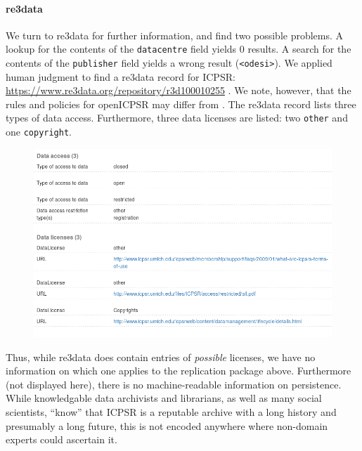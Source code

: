 \paragraph{re3data}
We turn to re3data for further information, and find two possible problems. A lookup for the contents of the \texttt{datacentre} field yields 0 results. A search for the contents of the \texttt{publisher} field yields a wrong result (\lstinline|<odesi>|). We applied human judgment to find a re3data record for ICPSR: \url{https://www.re3data.org/repository/r3d100010255} \parencite{Re3data-icpsr}. We note, however, that the rules and policies for openICPSR may differ from .
The re3data record lists three types of data access. Furthermore, three data licenses are listed: two \texttt{other} and one \texttt{copyright}.
\begin{figure}[H]
	\includegraphics[width=1\textwidth]{supplementary_materials/re3data-org-icpsr-access-licenses-20181008.png}
\end{figure}
Thus, while re3data does contain entries of \textit{possible} licenses, we have no information on which one applies to the replication package above. Furthermore (not displayed here), there is no machine-readable information on persistence. While knowledgable data archivists and librarians, as well as many social scientists, ``know'' that ICPSR is a reputable archive with a long history and presumably a long future, this is not encoded anywhere where non-domain experts could ascertain it.

